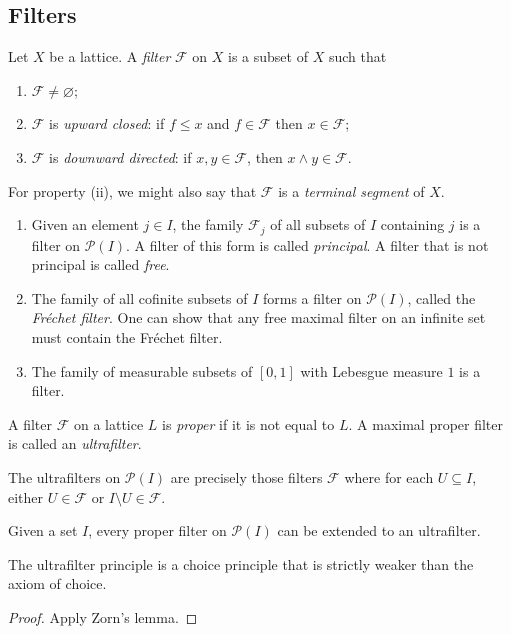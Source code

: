 \subsection{Filters}
\begin{definition}
    Let \( X \) be a lattice.
    A \emph{filter} \( \mathcal F \) on \( X \) is a subset of \( X \) such that
    \begin{enumerate}
        \item \( \mathcal F \neq \varnothing \);
        \item \( \mathcal F \) is \emph{upward closed}: if \( f \leq x \) and \( f \in \mathcal F \) then \( x \in \mathcal F \);
        \item \( \mathcal F \) is \emph{downward directed}: if \( x, y \in \mathcal F \), then \( x \wedge y \in \mathcal F \).
    \end{enumerate}
\end{definition}
For property (ii), we might also say that \( \mathcal F \) is a \emph{terminal segment} of \( X \).
\begin{example}
    \begin{enumerate}
        \item Given an element \( j \in I \), the family \( \mathcal F_j \) of all subsets of \( I \) containing \( j \) is a filter on \( \mathcal P(I) \).
        A filter of this form is called \emph{principal}.
        A filter that is not principal is called \emph{free}.
        \item The family of all cofinite subsets of \( I \) forms a filter on \( \mathcal P(I) \), called the \emph{Fr\'echet filter}.
        One can show that any free maximal filter on an infinite set must contain the Fr\'echet filter.
        \item The family of measurable subsets of \( [0,1] \) with Lebesgue measure \( 1 \) is a filter.
    \end{enumerate}
\end{example}
\begin{definition}
    A filter \( \mathcal F \) on a lattice \( L \) is \emph{proper} if it is not equal to \( L \).
    A maximal proper filter is called an \emph{ultrafilter}.
\end{definition}
The ultrafilters on \( \mathcal P(I) \) are precisely those filters \( \mathcal F \) where for each \( U \subseteq I \), either \( U \in \mathcal F \) or \( I \setminus U \in \mathcal F \).
\begin{proposition}
    Given a set \( I \), every proper filter on \( \mathcal P(I) \) can be extended to an ultrafilter.
\end{proposition}
The ultrafilter principle is a choice principle that is strictly weaker than the axiom of choice.
\begin{proof}
    Apply Zorn's lemma.
\end{proof}

